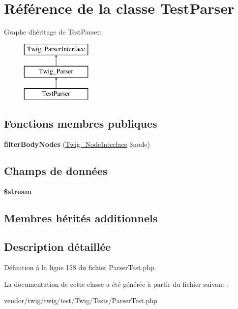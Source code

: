 \hypertarget{class_test_parser}{}\section{Référence de la classe Test\+Parser}
\label{class_test_parser}
Graphe d\textquotesingle{}héritage de Test\+Parser\+:\begin{figure}[H]
\begin{center}
\leavevmode
\includegraphics[height=3.000000cm]{class_test_parser}
\end{center}
\end{figure}
\subsection*{Fonctions membres publiques}
\begin{DoxyCompactItemize}
\item 
{\bfseries filter\+Body\+Nodes} (\hyperlink{interface_twig___node_interface}{Twig\+\_\+\+Node\+Interface} \$node)\hypertarget{class_test_parser_a230d5cb9ac5750b23c9228539ded64fb}{}\label{class_test_parser_a230d5cb9ac5750b23c9228539ded64fb}

\end{DoxyCompactItemize}
\subsection*{Champs de données}
\begin{DoxyCompactItemize}
\item 
{\bfseries \$stream}\hypertarget{class_test_parser_aa658946a5d6cb700e35df1fc7854e7b3}{}\label{class_test_parser_aa658946a5d6cb700e35df1fc7854e7b3}

\end{DoxyCompactItemize}
\subsection*{Membres hérités additionnels}


\subsection{Description détaillée}


Définition à la ligne 158 du fichier Parser\+Test.\+php.



La documentation de cette classe a été générée à partir du fichier suivant \+:\begin{DoxyCompactItemize}
\item 
vendor/twig/twig/test/\+Twig/\+Tests/Parser\+Test.\+php\end{DoxyCompactItemize}
